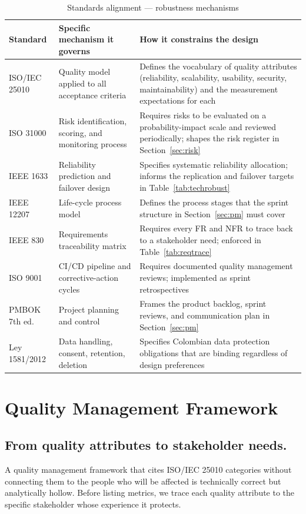 \documentclass[12pt,a4paper]{article}
\begin{document}
\begin{table}[h]
\caption{Standards alignment — robustness mechanisms}
\label{tab:standards}
\centering
\begin{tabularx}{\textwidth}{lXX}
\toprule
\textbf{Standard} & \textbf{Specific mechanism it governs} & \textbf{How it constrains the design} \\
\midrule
ISO/IEC 25010 & Quality model applied to all acceptance criteria & Defines the vocabulary of quality attributes (reliability, scalability, usability, security, maintainability) and the measurement expectations for each \\
ISO 31000 & Risk identification, scoring, and monitoring process & Requires risks to be evaluated on a probability-impact scale and reviewed periodically; shapes the risk register in Section~\ref{sec:risk} \\
IEEE 1633 & Reliability prediction and failover design & Specifies systematic reliability allocation; informs the replication and failover targets in Table~\ref{tab:techrobust} \\
IEEE 12207 & Life-cycle process model & Defines the process stages that the sprint structure in Section~\ref{sec:pm} must cover \\
IEEE 830 & Requirements traceability matrix & Requires every FR and NFR to trace back to a stakeholder need; enforced in Table~\ref{tab:reqtrace} \\
ISO 9001 & CI/CD pipeline and corrective-action cycles & Requires documented quality management reviews; implemented as sprint retrospectives \\
PMBOK 7th ed. & Project planning and control & Frames the product backlog, sprint reviews, and communication plan in Section~\ref{sec:pm} \\
Ley 1581/2012 & Data handling, consent, retention, deletion & Specifies Colombian data protection obligations that are binding regardless of design preferences \\
\bottomrule
\end{tabularx}
\end{table}

\section{Quality Management Framework}
\label{sec:quality}

\subsection{From quality attributes to stakeholder needs.}
A quality management framework that cites ISO/IEC 25010 categories
without connecting them to the people who will be affected is
technically correct but analytically hollow. Before listing
metrics, we trace each quality attribute to the specific stakeholder
whose experience it protects.
\end{document}
